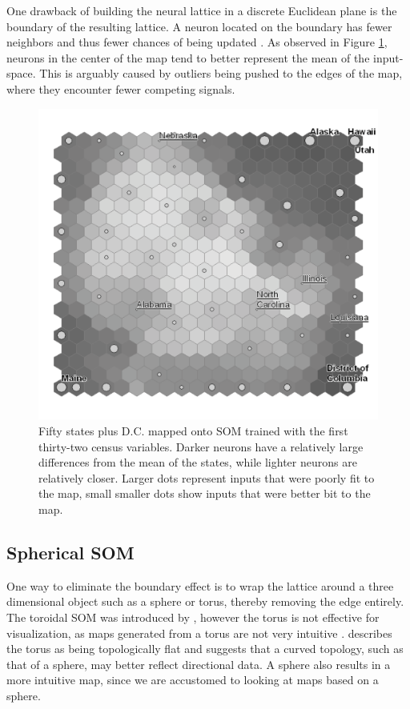 \documentclass[10pt,titlepage]{article}
\begin{document}
One drawback of building the neural lattice in a discrete Euclidean plane is the
boundary of the resulting lattice.  A neuron located on the boundary has fewer
neighbors and thus fewer chances of being updated \citep{wu2006}.  As observed
in Figure \ref{figure1}, neurons in the center of the map tend to better
represent the mean of the input-space.  This is arguably caused by outliers
being pushed to the edges of the map, where they encounter fewer competing
signals.

\begin{figure}
\centering
\includegraphics[width=.6\linewidth]{gridedge_grey.pdf}
\caption{Fifty states plus D.C. mapped onto SOM trained with the first
thirty-two census variables.  Darker neurons have a relatively large differences
from the mean of the states, while lighter neurons are relatively closer.
Larger dots represent inputs that were poorly fit to the map, small smaller dots
show inputs that were better bit to the map.}
\label{figure1}
\end{figure}


\subsection{Spherical SOM}
One way to eliminate the boundary effect is to wrap the lattice around a three
dimensional object such as a sphere or torus, thereby removing the edge
entirely. The toroidal SOM was introduced by \cite{li1993}, however the torus is
not effective for visualization, as maps generated from a torus are not
very intuitive \citep{ito2000,wu2006}.  \cite{ritter99} describes the torus as
being topologically flat and suggests that a curved topology, such as that of a
sphere, may better reflect directional data.  A sphere also results in a more
intuitive map, since we are accustomed to looking at maps based on a sphere.
\end{document}
